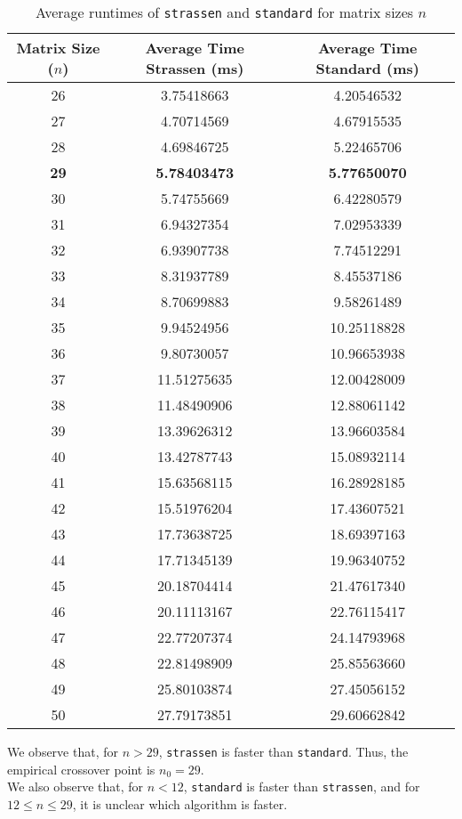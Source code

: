 \documentclass[11pt]{scrartcl}
\theoremstyle{dotlessP}
\theoremstyle{dotlessN}
\theoremstyle{dotN}
\begin{document}
\begin{table}[H]
\begin{subtable}{0.5\textwidth}
{\begin{tabular}{c|c|c}
       Matrix Size
       ($n$) & Average Time Strassen (ms) & Average Time Standard (ms) \\
\hline
26 & 3.75418663 & 4.20546532 \\
27 & 4.70714569 & 4.67915535 \\
28 & 4.69846725 & 5.22465706 \\
\textbf{29} & \textbf{5.78403473} & \textbf{5.77650070} \\
30 & 5.74755669 & 6.42280579 \\
31 & 6.94327354 & 7.02953339 \\
32 & 6.93907738 & 7.74512291 \\
33 & 8.31937789 & 8.45537186 \\
34 & 8.70699883 & 9.58261489 \\
35 & 9.94524956 & 10.25118828 \\
36 & 9.80730057 & 10.96653938 \\
37 & 11.51275635 & 12.00428009 \\
38 & 11.48490906 & 12.88061142 \\
39 & 13.39626312 & 13.96603584 \\
40 & 13.42787743 & 15.08932114 \\
41 & 15.63568115 & 16.28928185 \\
42 & 15.51976204 & 17.43607521 \\
43 & 17.73638725 & 18.69397163 \\
44 & 17.71345139 & 19.96340752 \\
45 & 20.18704414 & 21.47617340 \\
46 & 20.11113167 & 22.76115417 \\
47 & 22.77207374 & 24.14793968 \\
48 & 22.81498909 & 25.85563660 \\
49 & 25.80103874 & 27.45056152 \\
50 & 27.79173851 & 29.60662842 \\
\end{tabular}}
    \end{subtable}
    \caption{Average runtimes of \texttt{strassen} and \texttt{standard} for matrix sizes $n$}
\end{table}
We observe that, for $n > 29$, \texttt{strassen} is faster than \texttt{standard}. Thus, the empirical crossover point is $n_0 = 29$. 
\\

We also observe that, for $n < 12$, \texttt{standard} is faster than \texttt{strassen}, and for $12 \leq n \leq 29$, it is unclear which algorithm is faster.
\end{document}

